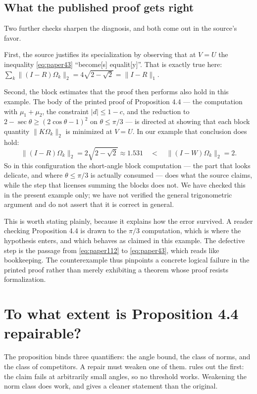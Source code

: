 \documentclass[11pt]{article}
\theoremstyle{definition}
\newcommand{\trnorm}[1]{\lVert #1\rVert_1}
\begin{document}
\subsection{What the published proof gets right}

Two further checks sharpen the diagnosis, and both come out in the source's
favor.

First, the source justifies its specialization by observing that at $V=U$ the
inequality \cref{eq:paper43} ``become[s] equalit[y]''.  That is exactly true
here: $\sum_k\lVert(I-R)\Omega_k\rVert_2=4\sqrt{2-\sqrt2}=\trnorm{I-R}$.

Second, the block estimates that the proof then performs also hold in this
example.  The body of the printed
proof of Proposition 4.4 — the computation with $\mu_1+\mu_2$, the constraint
$\lvert d\rvert\leq1-c$, and the reduction to
$2-\sec\theta\geq(2\cos\theta-1)^2$ on $\theta\leq\pi/3$ — is directed at showing
that each block quantity $\lVert K\Omega_k\rVert_2$ is minimized at $V=U$.  In
our example that conclusion does hold:
\[
 \lVert(I-R)\Omega_k\rVert_2=2\sqrt{2-\sqrt2}\approx1.531
 \quad<\quad
 \lVert(I-W)\Omega_k\rVert_2=2 .
\]
So in this configuration the short-angle block computation --- the part that
looks delicate, and where $\theta\leq\pi/3$ is actually consumed --- does what
the source claims, while the step that licenses summing the blocks does not.
We have checked this in the present example only; we have not verified the
general trigonometric argument and do not assert that it is correct in
general.

This is worth stating plainly, because it explains how the error survived.  A
reader checking Proposition 4.4 is drawn to the $\pi/3$ computation, which is
where the hypothesis enters, and which behaves as claimed in this example.  The defective step is the
passage from \cref{eq:paper112} to \cref{eq:paper43}, which reads like
bookkeeping.  The counterexample thus pinpoints a concrete logical failure in
the printed proof rather than merely exhibiting a theorem whose proof resists
formalization.

\section{To what extent is Proposition 4.4 repairable?}
\label{sec:repairs}

The proposition binds three quantifiers: the angle bound, the class of norms,
and the class of competitors.  A repair must weaken one of them.
 rules out the first: the claim fails at arbitrarily
small angles, so no threshold works.  Weakening the norm class does work, and
gives a cleaner statement than the original.
\end{document}
